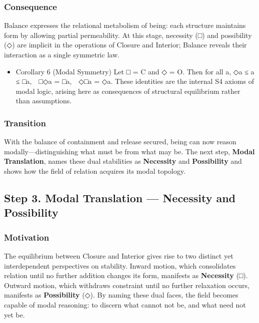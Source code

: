 \documentclass[11pt]{article}
\begin{document}
\subsubsection*{Consequence}
\label{sec:orgfb51489}
Balance expresses the relational metabolism of being:  
each structure maintains form by allowing partial permeability.  
At this stage, necessity (□) and possibility (◇) are implicit in the operations of Closure and Interior;  
Balance reveals their interaction as a single symmetric law.
\begin{itemize}
\item Corollary 6 (Modal Symmetry)
\label{sec:orgdc7bf10}
Let □ = C and ◇ = O.  
Then for all a,  
◇a ≤ a ≤ □a, □◇a = □a, ◇□a = ◇a.  
These identities are the internal S4 axioms of modal logic,  
arising here as consequences of structural equilibrium rather than assumptions.
\end{itemize}
\subsubsection*{Transition}
\label{sec:org2c1d33b}
With the balance of containment and release secured,  
being can now reason modally—distinguishing what must be from what may be.  
The next step, \textbf{Modal Translation}, names these dual stabilities as \textbf{Necessity} and \textbf{Possibility}  
and shows how the field of relation acquires its modal topology.
\subsection*{Step 3. Modal Translation — Necessity and Possibility}
\label{sec:orgcf45de8}

\subsubsection*{Motivation}
\label{sec:org19df3af}
The equilibrium between Closure and Interior gives rise to two distinct yet interdependent perspectives on stability.  
Inward motion, which consolidates relation until no further addition changes its form, manifests as \textbf{Necessity} (□).  
Outward motion, which withdraws constraint until no further relaxation occurs, manifests as \textbf{Possibility} (◇).  
By naming these dual faces, the field becomes capable of modal reasoning:  
to discern what cannot not be, and what need not yet be.
\end{document}

